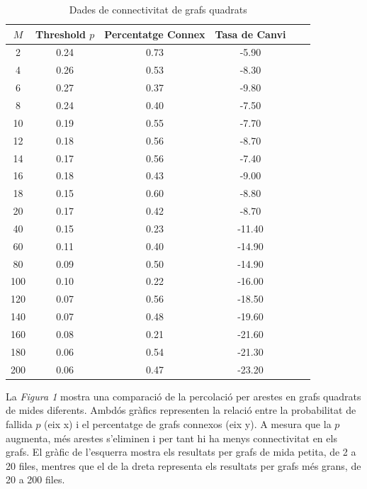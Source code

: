 \documentclass[a4paper]{article}
\begin{document}
	\begin{table}[h]
		\centering
		\begin{tabular}{|c|c|c|c|c|c|}
			\hline
			\rowcolor{gray!30}
			$M$ & Threshold $p$ & Percentatge Connex & Tasa de Canvi \\ \hline
			2 & 0.24 & 0.73 & -5.90 \\ \hline
			4 & 0.26 & 0.53 & -8.30 \\ \hline
			6 & 0.27 & 0.37 & -9.80 \\ \hline
			8 & 0.24 & 0.40 & -7.50 \\ \hline
			10 & 0.19 & 0.55 & -7.70 \\ \hline
			12 & 0.18 & 0.56 & -8.70 \\ \hline
			14 & 0.17 & 0.56 & -7.40 \\ \hline
			16 & 0.18 & 0.43 & -9.00 \\ \hline
			18 & 0.15 & 0.60 & -8.80 \\ \hline
			20 & 0.17 & 0.42 & -8.70 \\ \hline
			40 & 0.15 & 0.23 & -11.40 \\ \hline
			60 & 0.11 & 0.40 & -14.90 \\ \hline
			80 & 0.09 & 0.50 & -14.90 \\ \hline
			100 & 0.10 & 0.22 & -16.00 \\ \hline
			120 & 0.07 & 0.56 & -18.50 \\ \hline
			140 & 0.07 & 0.48 & -19.60 \\ \hline
			160 & 0.08 & 0.21 & -21.60 \\ \hline
			180 & 0.06 & 0.54 & -21.30 \\ \hline
			200 & 0.06 & 0.47 & -23.20 \\ \hline
		\end{tabular}
		\caption{Dades de connectivitat de grafs quadrats}
		\label{tab:conectividad_combinada}
	\end{table}
	
	La \textit{Figura 1} mostra una comparació de la percolació per arestes en grafs quadrats de mides diferents. Ambdós gràfics representen la relació entre la probabilitat de fallida $p$ (eix x) i el percentatge de grafs connexos (eix y). A mesura que la $p$ augmenta, més arestes s'eliminen i per tant hi ha menys connectivitat en els grafs. El gràfic de l'esquerra mostra els resultats per grafs de mida petita, de 2 a 20 files, mentres que el de la dreta representa els resultats per grafs més grans, de 20 a 200 files. \\
	
\end{document}
